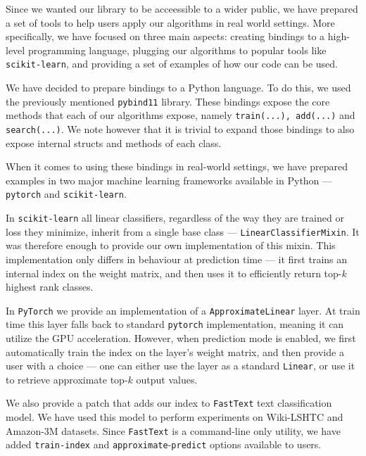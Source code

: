 Since we wanted our library to be acceessible to a wider public, we have prepared
a set of tools to help users apply our algorithms in real world settings. More specifically,
we have focused on three main aspects: creating bindings to a high-level programming language,
plugging our algorithms to popular tools like \texttt{scikit-learn}, and providing a set
of examples of how our code can be used.

We have decided to prepare bindings to a Python language. To do this, we used
the previously mentioned \texttt{pybind11} library. These bindings expose the core methods that
each of our algorithms expose, namely \texttt{train(...), add(...)} and \texttt{search(...)}.
We note however that it is trivial to expand those bindings to also expose internal
structs and methods of each class.

When it comes to using these bindings in real-world settings, we have prepared examples
in two major machine learning frameworks available in Python --- \texttt{pytorch}
and \texttt{scikit-learn}.

In \texttt{scikit-learn} all linear classifiers, regardless of the way they are trained
or loss they minimize, inherit from a single base class --- \texttt{LinearClassifierMixin}.
It was therefore enough to provide our own implementation of this mixin. This implementation
only differs in behaviour at prediction time --- it first trains an internal index on the
weight matrix, and then uses it to efficiently return top-$k$ highest rank classes.

In \texttt{PyTorch} we provide an implementation of a \texttt{ApproximateLinear} layer.
At train time this layer falls back to standard \texttt{pytorch} implementation, meaning
it can utilize the GPU acceleration. However, when prediction mode is enabled, we first
automatically train the index on the layer's weight matrix, and then provide a user with
a choice --- one can either use the layer as a standard \texttt{Linear}, or use it
to retrieve approximate top-$k$ output values.

We also provide a patch that adds our index to \texttt{FastText} text classification model.
We have used this model to perform experiments on Wiki-LSHTC and Amazon-3M datasets.
Since \texttt{FastText} is a command-line only utility, we have added \texttt{train-index}
and \texttt{approximate}-\texttt{predict} options available to users.
